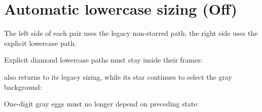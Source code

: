 \documentclass{jlreq}
\begin{document}
\section*{Automatic lowercase sizing (Off)}

The left side of each pair uses the legacy non-starred path; the right side
uses the explicit lowercase path.

\noindent
{}\quad
{}\quad
{}\quad
{}

\medskip
\noindent Explicit diamond lowercase paths must stay inside their frames:\par
{}\quad
{}%

\medskip
\noindent \texttt{\string\jegg} also returns to its legacy sizing, while its
star continues to select the gray background:\par
{}

\medskip
\noindent One-digit gray eggs must no longer depend on preceding state:\par
{}\quad
{}\quad
{}
\end{document}
